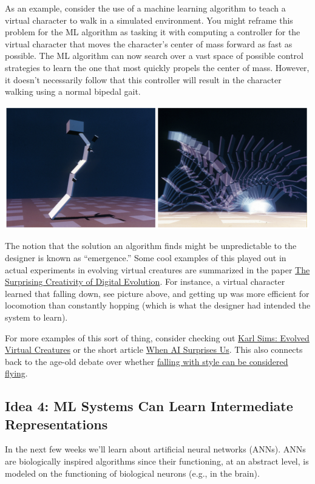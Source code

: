 \documentclass[assignment01_Solutions]{subfiles}
\begin{document}
As an example, consider the use of a machine learning algorithm to teach a virtual character to walk in a simulated environment.  You might reframe this problem for the ML algorithm as tasking it with computing a controller for the virtual character that moves the character's center of mass forward as fast as possible.  The ML algorithm can now search over a vast space of possible control strategies to learn the one that most quickly propels the center of mass.  However, it doesn't necessarily follow that this controller will result in the character walking using a normal bipedal gait.

\begin{center}
\includegraphics[width=.6\linewidth]{figures/fallingbot}
\end{center}

The notion that the solution an algorithm finds might be unpredictable to the designer is known as ``emergence.''  Some cool examples of this played out in actual experiments in evolving virtual creatures are summarized in the paper \href{https://arxiv.org/pdf/1803.03453.pdf}{The Surprising Creativity of Digital Evolution}.  For instance, a virtual character learned that falling down, see picture above, and getting up was more efficient for locomotion than constantly hopping (which is what the designer had intended the system to learn).

For more examples of this sort of thing, consider checking out \href{https://www.youtube.com/watch?v=bBt0imn77Zg}{Karl Sims: Evolved Virtual Creatures} or the short article \href{https://aiweirdness.com/post/172894792687/when-algorithms-surprise-us}{When AI Surprises Us}.  This also connects back to the age-old debate over whether \href{https://www.youtube.com/watch?v=8M_1GAX3WcI}{falling with style can be considered flying}.


\subsection*{Idea 4: ML Systems Can Learn Intermediate Representations}

In the next few weeks we'll learn about artificial neural networks (ANNs).  ANNs are biologically inspired algorithms since their functioning, at an abstract level, is modeled on the functioning of biological neurons (e.g., in the brain).
\end{document}

